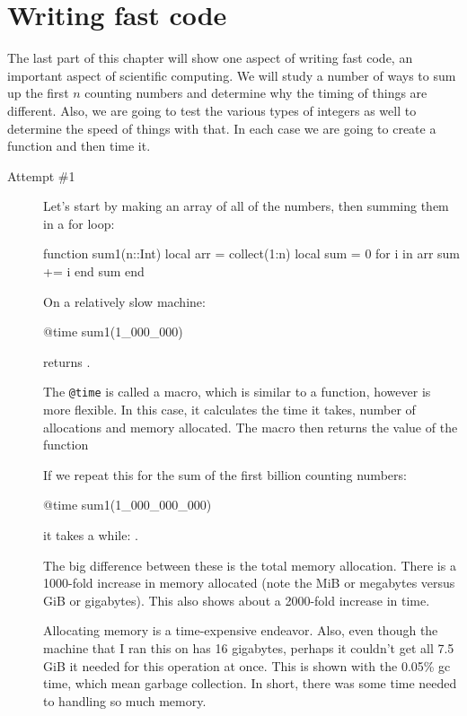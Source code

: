 \section{Writing fast code}

The last part of this chapter will show one aspect of writing fast code, an important aspect of scientific computing. We will study a number of ways to sum up the first $n$ counting numbers and determine why the timing of
things are different. Also, we are going to test the various types of integers as well to determine the speed of things with that. In each case we are going to create a function and then time it. 

\begin{description}
\item[Attempt \#1]

Let's start by making an array of all of the numbers, then summing them
in a for loop:

\begin{jlblock}[fastcode]
function sum1(n::Int)
  local arr = collect(1:n)
  local sum = 0
  for i in arr
    sum += i
  end
  sum
end
\end{jlblock}

 On a relatively slow machine:
%
\begin{jlverbatim}
@time sum1(1_000_000)
\end{jlverbatim}
%
returns
%
 \printpythontex[verbatim].

The \texttt{@time} is called a macro, which is similar to a function, however is more flexible.  In this case, it calculates the time it takes, number of allocations and memory allocated.  The macro then returns the value of the function 

If we repeat this for the sum of the first billion counting numbers: 
%
\begin{jlverbatim}
@time sum1(1_000_000_000)
\end{jlverbatim}
%
%
it takes a while: \printpythontex[verbatim].

The big difference between these is the total memory allocation. There is a 1000-fold increase in memory allocated (note the MiB or megabytes versus GiB or gigabytes).  This also shows about a 2000-fold increase in time.  

Allocating memory is a time-expensive endeavor.  Also, even though the machine that I ran this on has 16 gigabytes, perhaps it couldn't get all 7.5 GiB it needed for this operation at once.  This is shown with the 0.05\% gc time, which mean garbage collection.  In short, there was some time needed to handling so much memory. 


\end{description}
